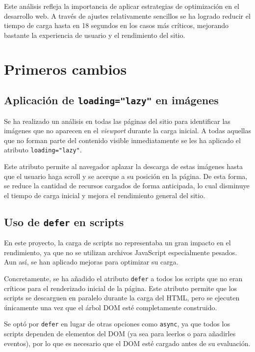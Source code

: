 \documentclass{article}
\begin{document}
Este análisis refleja la importancia de aplicar estrategias de optimización en el desarrollo web. A través de ajustes relativamente sencillos se ha logrado reducir el tiempo de carga hasta en 18 segundos en los casos más críticos, mejorando bastante la experiencia de usuario y el rendimiento del sitio.

\section{Primeros cambios}\label{sec:primeros-cambios}

\subsection{Aplicación de \texttt{loading="lazy"} en imágenes}\label{subsec:loading-lazy}

Se ha realizado un análisis en todas las páginas del sitio para identificar las imágenes que no aparecen en el \textit{viewport} durante la carga inicial. A todas aquellas que no forman parte del contenido visible inmediatamente se les ha aplicado el atributo \texttt{loading="lazy"}.

Este atributo permite al navegador aplazar la descarga de estas imágenes hasta que el usuario haga scroll y se acerque a su posición en la página. De esta forma, se reduce la cantidad de recursos cargados de forma anticipada, lo cual disminuye el tiempo de carga inicial y mejora el rendimiento general del sitio.

\subsection{Uso de \texttt{defer} en scripts}\label{subsec:defer-en-scripts}

En este proyecto, la carga de scripts no representaba un gran impacto en el rendimiento, ya que no se utilizan archivos JavaScript especialmente pesados. Aun así, se han aplicado mejoras para optimizar su carga.

Concretamente, se ha añadido el atributo \texttt{defer} a todos los scripts que no eran críticos para el renderizado inicial de la página. Este atributo permite que los scripts se descarguen en paralelo durante la carga del HTML, pero se ejecuten únicamente una vez que el árbol DOM esté completamente construido.

Se optó por \texttt{defer} en lugar de otras opciones como \texttt{async}, ya que todos los scripts dependen de elementos del DOM (ya sea para leerlos o para añadirles eventos), por lo que es necesario que el DOM esté cargado antes de su evaluación.
\end{document}
